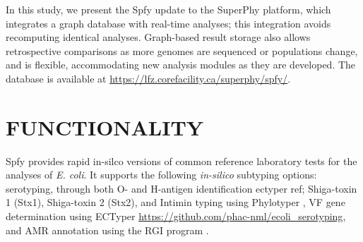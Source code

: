\documentclass{article}
\begin{document}
In this study, we present the Spfy update to the SuperPhy platform, which integrates a graph database with real-time analyses; this integration avoids recomputing identical analyses. Graph-based result storage also allows retrospective comparisons as more genomes are sequenced or populations change, and is flexible, accommodating new analysis modules as they are developed. The database is available at \url{https://lfz.corefacility.ca/superphy/spfy/}.



\enlargethispage{-65.1pt}



\section{FUNCTIONALITY}

Spfy provides rapid in-silco versions of common reference laboratory tests for the analyses of \textit{E. coli}. It supports the following \textit{in-silico} subtyping options: serotyping, through both O- and H-antigen identification {ectyper ref}; Shiga-toxin 1 (Stx1), Shiga-toxin 2 (Stx2), and Intimin typing using Phylotyper \cite{whiteside2017phylotyper}, VF gene determination using ECTyper \url{https://github.com/phac-nml/ecoli\_serotyping}, and AMR annotation using the RGI program \cite{mcarthur2013comprehensive}.
\end{document}
